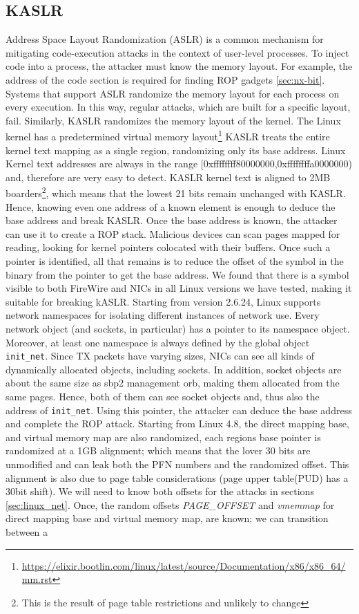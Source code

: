 \subsection{KASLR}\label{sec:kaslr}
Address Space Layout Randomization (ASLR) is a common mechanism for mitigating code-execution attacks in the context of user-level processes. To inject code into a process, the attacker must know the memory layout. For example, the address of the code section is required for finding ROP gadgets \ref{sec:nx-bit}. Systems that support ASLR randomize the memory layout for each process on every execution. In this way, regular attacks, which are built for a specific layout, fail. Similarly, KASLR \cite{kalsr} randomizes the memory layout of the kernel. The Linux kernel has a predetermined virtual memory layout\footnote{\url{https://elixir.bootlin.com/linux/latest/source/Documentation/x86/x86_64/mm.rst}} KASLR treats the entire kernel text mapping as a single region, randomizing only its base address. Linux Kernel text addresses are always in the range [0xffffffff80000000,0xffffffffa0000000) and, therefore are very easy to detect. KASLR kernel text is aligned to 2MB boarders\footnote{This is the result of page table restrictions and unlikely to change}, which means that the lowest 21 bits remain unchanged with KASLR. Hence, knowing even one address of a known element is enough to deduce the base address and break KASLR. Once the base address is known, the attacker can use it to create a ROP stack. Malicious devices can scan pages mapped for reading, looking for kernel pointers colocated with their buffers. Once such a pointer is identified, all that remains is to reduce the offset of the symbol in the binary from the pointer to get the base address. We found that there is a symbol visible to both FireWire and NICs in all Linux versions we have tested, making it suitable for breaking kASLR. Starting from version 2.6.24, Linux supports network namespaces for isolating different instances of network use. Every network object (and sockets, in particular) has a pointer to its namespace object. Moreover, at least one namespace is always defined by the global object \texttt{init\_net}. Since TX packets have varying sizes, NICs can see all kinds of dynamically allocated objects, including sockets. In addition, socket objects are about the same size as sbp2 management orb, making them allocated from the same pages. Hence, both of them can see socket objects and, thus also the address of \texttt{init\_net}. Using this pointer, the attacker can deduce the base address and complete the ROP attack. \newline Starting from Linux 4.8, the direct mapping base, and virtual memory map are also randomized, each regions base pointer is randomized at a 1GB alignment; which means that the lover 30 bits are unmodified and can leak both the PFN numbers and the randomized offset. This alignment is also due to page table considerations (page upper table(PUD) has a 30bit shift). We will need to know both offsets for the attacks in sections \ref{sec:linux_net}. Once, the random offsets \textit{PAGE\_OFFSET} and \textit{vmemmap} for direct mapping base and virtual memory map, are known; we can transition between a \kva 